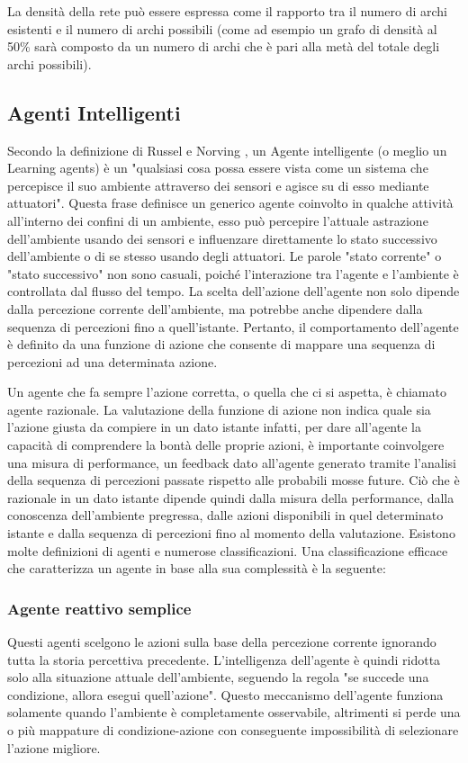 La densità della rete può essere espressa come il rapporto tra il numero di archi esistenti e il numero di archi possibili (come ad esempio un grafo di densità al 50\% sarà composto da un numero di archi che è pari alla metà del totale degli archi possibili). \cite{NetworkScience}

\subsection{Agenti Intelligenti}

Secondo la definizione di Russel e Norving \cite{RusselNorvig}, un Agente intelligente (o meglio un Learning agents) è un "qualsiasi cosa possa essere vista come un sistema che percepisce il suo ambiente attraverso dei sensori e agisce su di esso mediante attuatori".
Questa frase definisce un generico agente coinvolto in qualche attività all'interno dei confini di un ambiente, esso può percepire l'attuale astrazione dell'ambiente usando dei sensori e influenzare direttamente lo stato successivo dell'ambiente o di se stesso usando degli attuatori. Le parole "stato corrente" o "stato successivo" non sono casuali, poiché l'interazione tra l’agente e l'ambiente è controllata dal flusso del tempo. La scelta dell'azione dell'agente non solo dipende dalla percezione corrente dell'ambiente, ma potrebbe anche dipendere dalla sequenza di percezioni fino a quell'istante. Pertanto, il comportamento dell'agente è definito da una funzione di azione che consente di mappare una sequenza di percezioni ad una determinata azione.

Un agente che fa sempre l'azione corretta, o quella che ci si aspetta, è chiamato agente razionale.
La valutazione della funzione di azione non indica quale sia l'azione giusta da compiere in un dato istante infatti, per dare all'agente la capacità di comprendere la bontà delle proprie azioni, è importante coinvolgere una misura di performance, un feedback dato all'agente generato tramite l'analisi della sequenza di percezioni passate rispetto alle probabili mosse future.
Ciò che è razionale in un dato istante dipende quindi dalla misura della performance, dalla conoscenza dell'ambiente pregressa, dalle azioni disponibili in quel determinato istante e dalla sequenza di percezioni fino al momento della valutazione.
Esistono molte definizioni di agenti e numerose classificazioni. Una classificazione efficace che caratterizza un agente in base alla sua complessità è la seguente:

\subsubsection{Agente reattivo semplice}
Questi agenti scelgono le azioni sulla base della percezione corrente ignorando tutta la storia percettiva precedente.
L'intelligenza dell'agente è quindi ridotta solo alla situazione attuale dell'ambiente, seguendo la regola "se succede una condizione, allora esegui quell'azione". Questo meccanismo dell'agente funziona solamente quando l'ambiente è completamente osservabile, altrimenti si perde una o più mappature di condizione-azione con conseguente impossibilità di selezionare l'azione migliore.

